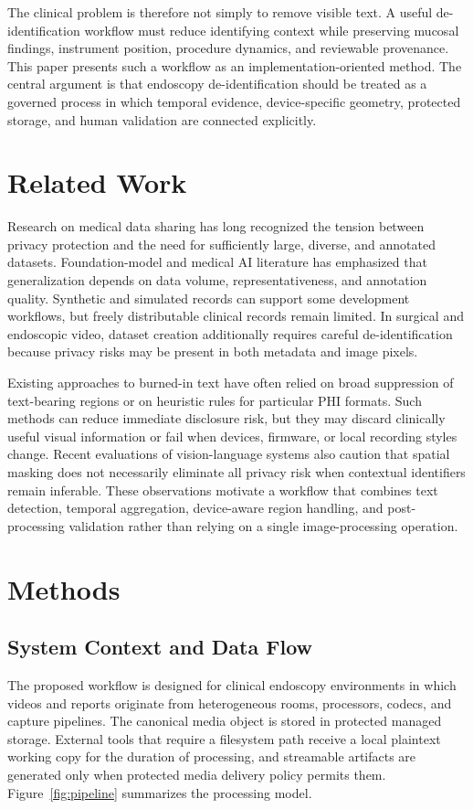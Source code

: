 \documentclass{article}
\begin{document}
The clinical problem is therefore not simply to remove visible text. A useful
de-identification workflow must reduce identifying context while preserving
mucosal findings, instrument position, procedure dynamics, and reviewable
provenance. This paper presents such a workflow as an implementation-oriented
method. The central argument is that endoscopy de-identification should be
treated as a governed process in which temporal evidence, device-specific
geometry, protected storage, and human validation are connected explicitly.

\section{Related Work}
Research on medical data sharing has long recognized the tension between
privacy protection and the need for sufficiently large, diverse, and annotated
datasets. Foundation-model and medical AI literature has emphasized that
generalization depends on data volume, representativeness, and annotation
quality. \cite{moor2023foundation} Synthetic and simulated records can support
some development workflows, but freely distributable clinical records remain
limited. \cite{walonoski2018synthea} In surgical and endoscopic video, dataset
creation additionally requires careful de-identification because privacy risks
may be present in both metadata and image pixels. \cite{bilal2025temset}

Existing approaches to burned-in text have often relied on broad suppression of
text-bearing regions or on heuristic rules for particular PHI formats. Such
methods can reduce immediate disclosure risk, but they may discard clinically
useful visual information or fail when devices, firmware, or local recording
styles change. \cite{macdonald2024method} Recent evaluations of
vision-language systems also caution that spatial masking does not necessarily
eliminate all privacy risk when contextual identifiers remain inferable.
\cite{young2025vision} These observations motivate a workflow that combines
text detection, temporal aggregation, device-aware region handling, and
post-processing validation rather than relying on a single image-processing
operation.

\section{Methods}
\subsection{System Context and Data Flow}
The proposed workflow is designed for clinical endoscopy environments in which
videos and reports originate from heterogeneous rooms, processors, codecs, and
capture pipelines. The canonical media object is stored in protected managed
storage. External tools that require a filesystem path receive a local plaintext
working copy for the duration of processing, and streamable artifacts are
generated only when protected media delivery policy permits them.
Figure~\ref{fig:pipeline} summarizes the processing model.
\end{document}
